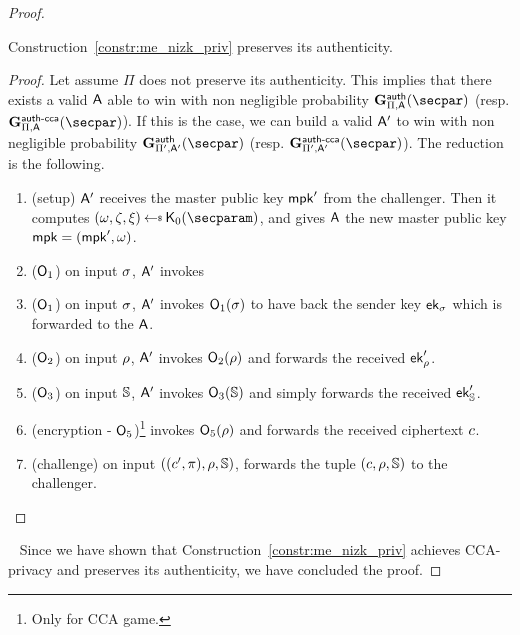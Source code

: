 \begin{proof}
    \begin{lemma}\label{lemma:me_auth_same}
        Construction~\ref{constr:me_nizk_priv} preserves its authenticity.
        \begin{proof}
            Let assume $\Pi$ does not preserve its authenticity.
            This implies that there exists a valid $\mathsf{A}$ able to win with non negligible probability $\NISHeufgame{}_{\Pi, \adversary}(\secpar)$ (resp. $\NISHeufgamecca{}_{\Pi, \adversary}(\secpar)$).
            If this is the case, we can build a valid $\mathsf{A}'$ to win with non negligible probability $\NISHeufgame{}_{\Pi', \adversary'}(\secpar)$ (resp. $\NISHeufgamecca{}_{\Pi', \adversary'}(\secpar)$).
            The reduction is the following.

            \begin{enumerate}
                \item (setup) $\mathsf{A}'$ receives the master public key $\mathsf{mpk}'$ from the challenger. Then it computes $(\crs,\tpsim,\tpext)\getsr\nizkext_0(\secparam)$, and gives $\mathsf{A}$ the new master public key $\mathsf{mpk} = (\mathsf{mpk}', \omega)$.
                \item ($\mathsf{O}_1$) on input $\sigma$, $\mathsf{A}'$ invokes \item ($\mathsf{O}_1$) on input $\sigma$, $\mathsf{A}'$ invokes $\mathsf{O}_1(\sigma)$ to have back the sender key $\mathsf{ek}_\sigma$ which is forwarded to the $\mathsf{A}$.
                \item ($\mathsf{O}_2$) on input $\rho$, $\mathsf{A}'$ invokes $\mathsf{O}_2(\rho)$ and forwards the received $\mathsf{ek}'_\rho$.
                \item ($\mathsf{O}_3$) on input $\mathbb{S}$, $\mathsf{A}'$ invokes $\mathsf{O}_3(\mathbb{S})$ and simply forwards the received $\mathsf{ek}'_{\mathbb{S}}$.
                \item (encryption - $\mathsf{O}_5$)\footnote{Only for CCA game.} invokes $\mathsf{O}_5(\rho)$ and forwards the received ciphertext $c$.
                \item (challenge) on input $((c', \pi), \rho, \mathbb{S})$, forwards the tuple $(c, \rho, \mathbb{S})$ to the challenger.
            \end{enumerate}
        \end{proof}
    \end{lemma}
    ~\newline
    Since we have shown that Construction~\ref{constr:me_nizk_priv} achieves CCA-privacy and preserves its authenticity, we have concluded the proof.
\end{proof}
